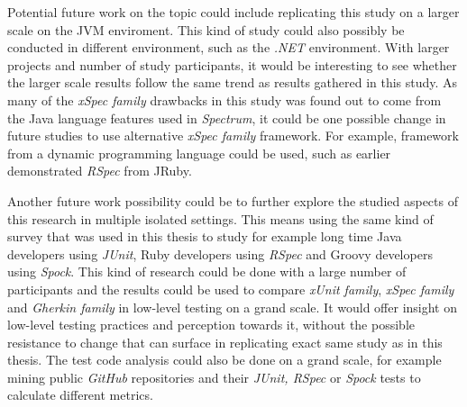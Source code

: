 Potential future work on the topic could include replicating this study on a larger scale on the JVM enviroment.
This kind of
study could also possibly be conducted in different environment, such as the \textit{.NET} environment. With
larger projects and number of study participants, it would be interesting to see whether the larger scale results
follow the same trend as results gathered in this study.
As many of the \textit{xSpec family} drawbacks in this study was found out to
come from the Java language features used in \textit{Spectrum}, it could be one possible change in future studies to use
alternative \textit{xSpec family} framework.
For example, framework from a dynamic programming language could be used, such as earlier demonstrated \textit{RSpec} from JRuby.

Another future work possibility could be to further explore the studied aspects of this research in multiple isolated settings.
This means using the same kind of survey that was used in this thesis to study for example long time Java developers using \textit{JUnit},
Ruby developers using \textit{RSpec} and Groovy developers using \textit{Spock}.
This kind of research could be done with a large number of participants and the results
could be used to compare \textit{xUnit family}, \textit{xSpec family} and \textit{Gherkin family} in low-level testing on
a grand scale.
It would offer insight on low-level testing
practices and perception towards it, without the possible resistance to change that can surface in replicating exact
same study as in this thesis. The test code analysis could also be done on a grand scale, for example mining
public \textit{GitHub} repositories and their \textit{JUnit, RSpec} or \textit{Spock} tests to calculate different metrics.
